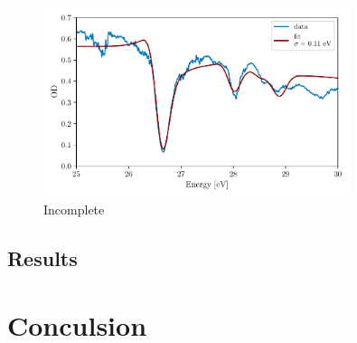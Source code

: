 \begin{figure}
	\centering
	\includegraphics[width=0.8\textwidth]{figures/ATS/fano_fit.pdf}
	\caption{Incomplete}
	\label{fig:fano_fit}
\end{figure}

\subsection{Results}
\label{sec:ATS_ar_results}

\section{Conculsion}
\label{sec:ATS_conclusion}

